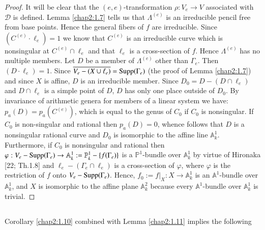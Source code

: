 \begin{proof}
It will be clear that the $(e,e)$-transformation $\rho:V_{e}\to V$
associated with $\mathscr{D}$ is defined. Lemma \ref{chap2:1.7} tells us
that $\Lambda^{(e)}$ is an irreducible pencil free from base
points. Hence the general fibers of $f$ are irreducible. Since
$(C^{(e)}\cdot\ell_{e})=1$ we know that $C^{(e)}$ is an irreducible
curve which is nonsingular at $C^{(e)}\cap \ell_{e}$ and that
$\ell_{e}$ is a cross-section of $f$. Hence $\Lambda^{(e)}$ has no
multiple members. Let $D$ be a member of $\Lambda^{(e)}$ other than
$\Gamma_{e}$. Then $(D\cdot \ell_{e})=1$. Since
$\overline{V_{e}-(X\cup \ell_{e})}=\operatorname{Supp}(\Gamma_{e})$ (\cf the proof
of Lemma \ref{chap2:1.7}) and since $X$ is affine, $D$ is an irreducible
member. Since $D_{0}=D-(D\cap \ell_{e})$ and $D\cap \ell_{e}$ is a
simple point of $D$, $D$ has only one place outside of $D_{0}$. By
invariance of arithmetic genera for members of a linear system we
have: $p_{a}(D)=p_{a}(C^{(e)})$, which is equal to the genus of
$C_{0}$ if $C_{0}$ is nonsingular. If $C_{0}$ is non-singular and
rational then $p_{a}(D)=0$, whence follows that $D$ is a nonsingular
rational curve and $D_{0}$ is isomorphic to the affine line
$\mathbb{A}^{1}_{k}$. Furthermore, if $C_{0}$ is nonsingular and
rational then $\varphi:V_{e}-\operatorname{Supp}(\Gamma_{e})\to
\mathbb{A}^{1}_{k}:=\mathbb{P}^{1}_{k}-\{f(\Gamma_{e})\}$ is a
$\mathbb{P}^{1}$-bundle over $\mathbb{A}^{1}_{k}$ by virtue of
Hironaka [22; Th.\@ 1.8] and $\ell_{e}-(\Gamma_{e}\cap \ell_{e})$ is a
cross-section of $\varphi$, where $\varphi$ is the restriction of $f$
onto $V_{e}-\operatorname{Supp}(\Gamma_{e})$. Hence, $f_{0}:=f|_{X}:X\to
\mathbb{A}^{1}_{k}$ is an $\mathbb{A}^{1}$-bundle over
$\mathbb{A}^{1}_{k}$, and $X$ is isomorphic to the affine plane
$\mathbb{A}^{2}_{k}$ because every $\mathbb{A}^{1}$-bundle over
$\mathbb{A}^{1}_{k}$ is trivial.
\end{proof}


\subsection{}\label{chap2:1.12}
Corollary \ref{chap2:1.10} combined with Lemma \ref{chap2:1.11} implies the
following 

